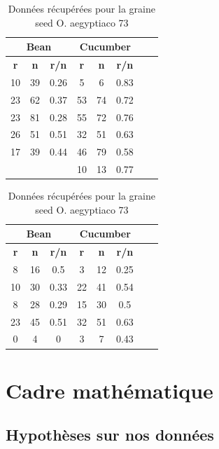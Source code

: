 \documentclass[
]{article}
\begin{document}
\begin{table}[h]
\centering
\small
\begin{minipage}{0.45\textwidth}
\centering
\begin{tabular}{|c|c|c|c|c|c|c|c|}
\hline
\multicolumn{3}{|c|}{\textbf{Bean}} & \multicolumn{3}{|c|}{\textbf{Cucumber}} \\
\hline
\textbf{r} & \textbf{n} & \textbf{r/n} & \textbf{r} & \textbf{n} & \textbf{r/n} \\
\hline
10 & 39 & 0.26 & 5 & 6 & 0.83 \\
23 & 62 & 0.37 & 53 & 74 & 0.72 \\
23 & 81 & 0.28 & 55 & 72 & 0.76 \\
26 & 51 & 0.51 & 32 & 51 & 0.63 \\
17 & 39 & 0.44 & 46 & 79 & 0.58 \\
 & & & 10 & 13 & 0.77 \\
\hline
\end{tabular}
\caption{Données récupérées pour la graine seed O. aegyptiaco 75}
\label{tab:tableau1}
\end{minipage}\hfill
\begin{minipage}{0.45\textwidth}
\centering
\begin{tabular}{|c|c|c|c|c|c|c|c|}
\hline
\multicolumn{3}{|c|}{\textbf{Bean}} & \multicolumn{3}{|c|}{\textbf{Cucumber}} \\
\hline
\textbf{r} & \textbf{n} & \textbf{r/n} & \textbf{r} & \textbf{n} & \textbf{r/n} \\
\hline
8 & 16 & 0.5 & 3 & 12 & 0.25 \\
10 & 30 & 0.33 & 22 & 41 & 0.54 \\
8 & 28 & 0.29 & 15 & 30 & 0.5 \\
23 & 45 & 0.51 & 32 & 51 & 0.63 \\
0 & 4 & 0 & 3 & 7 & 0.43 \\
\hline
\end{tabular}
\caption{Données récupérées pour la graine seed O. aegyptiaco 73}
\label{tab:tableau2}
\end{minipage}
\end{table}

\hypertarget{cadre-mathuxe9matique}{%
\section{Cadre mathématique}\label{cadre-mathuxe9matique}}

\hypertarget{hypothuxe8ses-sur-nos-donnuxe9es}{%
\subsection{Hypothèses sur nos
données}\label{hypothuxe8ses-sur-nos-donnuxe9es}}
\end{document}
